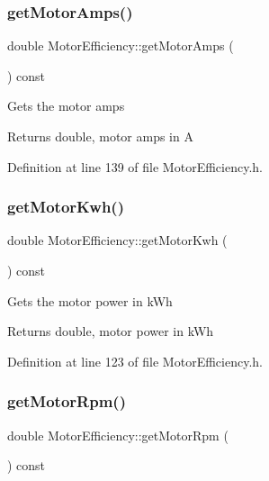 \subsubsection{\texorpdfstring{get\+Motor\+Amps()}{getMotorAmps()}}
{\footnotesize\ttfamily double Motor\+Efficiency\+::get\+Motor\+Amps (\begin{DoxyParamCaption}{ }\end{DoxyParamCaption}) const\hspace{0.3cm}{\ttfamily [inline]}}

Gets the motor amps \begin{DoxyReturn}{Returns}
double, motor amps in A 
\end{DoxyReturn}


Definition at line 139 of file Motor\+Efficiency.\+h.

\mbox{\label{class_motor_efficiency_a4d21d0c44ee00f5d097b0acbcb73a8d8}} 
\subsubsection{\texorpdfstring{get\+Motor\+Kwh()}{getMotorKwh()}}
{\footnotesize\ttfamily double Motor\+Efficiency\+::get\+Motor\+Kwh (\begin{DoxyParamCaption}{ }\end{DoxyParamCaption}) const\hspace{0.3cm}{\ttfamily [inline]}}

Gets the motor power in k\+Wh \begin{DoxyReturn}{Returns}
double, motor power in k\+Wh 
\end{DoxyReturn}


Definition at line 123 of file Motor\+Efficiency.\+h.

\mbox{\label{class_motor_efficiency_ab29655f487e90a73246be6e9bc67c36a}} 
\subsubsection{\texorpdfstring{get\+Motor\+Rpm()}{getMotorRpm()}}
{\footnotesize\ttfamily double Motor\+Efficiency\+::get\+Motor\+Rpm (\begin{DoxyParamCaption}{ }\end{DoxyParamCaption}) const\hspace{0.3cm}{\ttfamily [inline]}}

